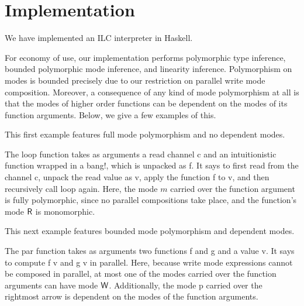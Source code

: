 \section{Implementation}
\label{sec:implementation}

We have implemented an ILC interpreter in Haskell.

For economy of use, our implementation performs polymorphic type inference,
bounded polymorphic mode inference, and linearity inference. Polymorphism on
modes is bounded precisely due to our restriction on parallel write mode
composition. Moreover, a consequence of any kind of mode polymorphism at all is
that the modes of higher order functions can be dependent on the modes of its
function arguments. Below, we give a few examples of this.

This first example features full mode polymorphism and no dependent modes.

The \textsf{loop} function
takes as arguments a read channel \textsf{c} and an intuitionistic function
wrapped in a bang!, which is unpacked as \textsf{f}.  It says to first read from
the channel \textsf{c}, unpack the read value as \textsf{v}, apply the function
\textsf{f} to \textsf{v}, and then recursively call \textsf{loop} again. Here,
the mode $m$ carried over the function argument is fully polymorphic, since no
parallel compositions take place, and the function's mode $\textsf{R}$ is monomorphic.

This next example features bounded mode polymorphism and dependent modes.

The \textsf{par} function takes as arguments two functions \textsf{f} and
\textsf{g} and a value \textsf{v}. It says to compute \textsf{f v} and \textsf{g
  v} in parallel. Here, because write mode expressions cannot be composed in
parallel, at most one of the modes carried over the function arguments can have
mode $\textsf{W}$. Additionally, the mode \textsf{p} carried over the rightmost arrow
is dependent on the modes of the function arguments.
